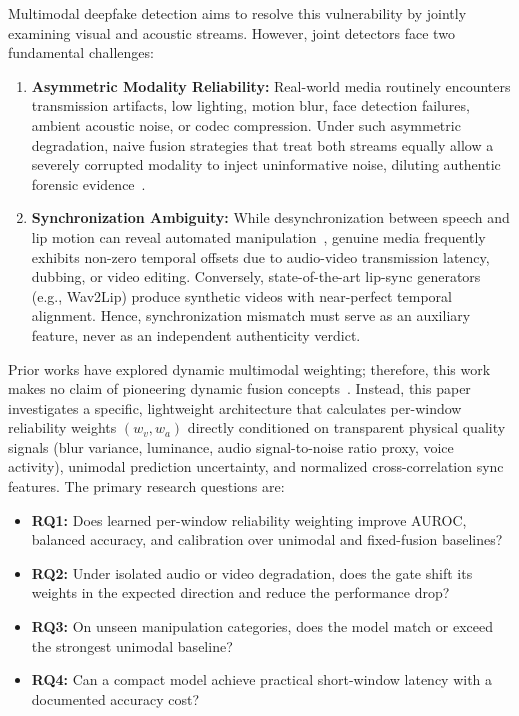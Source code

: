 \documentclass[conference]{IEEEtran}
\begin{document}
Multimodal deepfake detection aims to resolve this vulnerability by jointly examining visual and acoustic streams. However, joint detectors face two fundamental challenges:
\begin{enumerate}
    \item \textbf{Asymmetric Modality Reliability:} Real-world media routinely encounters transmission artifacts, low lighting, motion blur, face detection failures, ambient acoustic noise, or codec compression. Under such asymmetric degradation, naive fusion strategies that treat both streams equally allow a severely corrupted modality to inject uninformative noise, diluting authentic forensic evidence~\cite{zhou2021,cai2025modality}.
    \item \textbf{Synchronization Ambiguity:} While desynchronization between speech and lip motion can reveal automated manipulation~\cite{chugh2020,chung2016}, genuine media frequently exhibits non-zero temporal offsets due to audio-video transmission latency, dubbing, or video editing. Conversely, state-of-the-art lip-sync generators (e.g., Wav2Lip) produce synthetic videos with near-perfect temporal alignment. Hence, synchronization mismatch must serve as an auxiliary feature, never as an independent authenticity verdict.
\end{enumerate}

Prior works have explored dynamic multimodal weighting; therefore, this work makes no claim of pioneering dynamic fusion concepts~\cite{wang2024}. Instead, this paper investigates a specific, lightweight architecture that calculates per-window reliability weights $(w_v, w_a)$ directly conditioned on transparent physical quality signals (blur variance, luminance, audio signal-to-noise ratio proxy, voice activity), unimodal prediction uncertainty, and normalized cross-correlation sync features. The primary research questions are:
\begin{itemize}\setlength{\itemsep}{1.5pt}\setlength{\parskip}{0pt}\setlength{\parsep}{0pt}
    \item \textbf{RQ1:} Does learned per-window reliability weighting improve AUROC, balanced accuracy, and calibration over unimodal and fixed-fusion baselines?
    \item \textbf{RQ2:} Under isolated audio or video degradation, does the gate shift its weights in the expected direction and reduce the performance drop?
    \item \textbf{RQ3:} On unseen manipulation categories, does the model match or exceed the strongest unimodal baseline?
    \item \textbf{RQ4:} Can a compact model achieve practical short-window latency with a documented accuracy cost?
\end{itemize}
\end{document}
